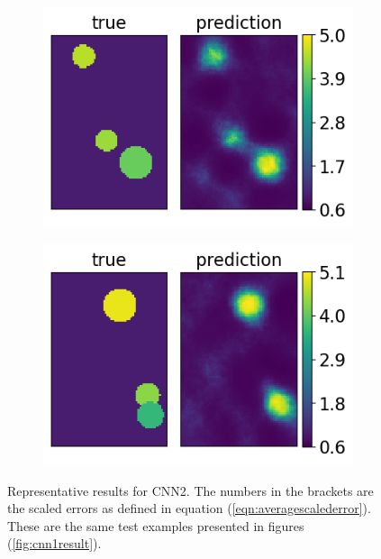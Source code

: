 \documentclass[12pt]{article}
\newcommand{\nhghalfwidth}{0.48\linewidth}
\newcommand{\nhgtotalheight}{4cm}
\begin{document}
%
\begin{figure}[!h]
  \centering
  \begin{subfigure}[c]{\nhghalfwidth}
    \centering
    \includegraphics[totalheight=\nhgtotalheight]{Figures/AppendixNew/CNN2/ex3/mu.png}
  \end{subfigure}
  \begin{subfigure}[c]{\nhghalfwidth}
    \centering
    \includegraphics[totalheight=\nhgtotalheight]{Figures/AppendixNew/CNN2/ex4/mu.png}
  \end{subfigure}
\caption{\label{fig:cnn2result} Representative results for CNN2. The numbers in the brackets are the scaled errors as defined in equation (\ref{eqn:averagescalederror}). These are the same test examples presented in figures (\ref{fig:cnn1result}).}  
\end{figure}
%
\end{document}
